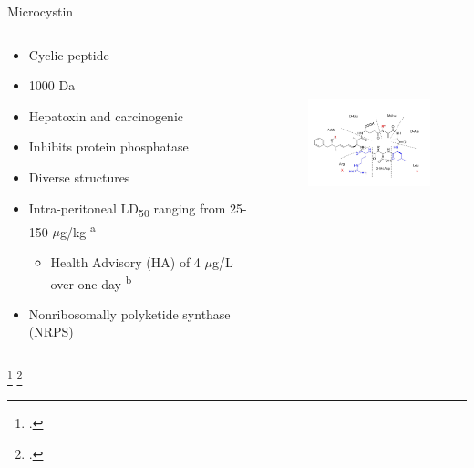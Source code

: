 \begin{frame}{Microcystin}

\begin{columns}
	\begin{column}{0.5\textwidth}

	\begin{itemize}
		\item Cyclic peptide
		\item 1000 Da
		\item Hepatoxin and carcinogenic
		\item Inhibits protein phosphatase
		\item Diverse structures 
		\item Intra-peritoneal LD\textsubscript{50} ranging from 25-150 $\mu$g/kg  \textsuperscript{a}
			\begin{itemize}
				\item Health Advisory (HA) of 4 $\mu$g/L over one day \textsuperscript{b}
			\end{itemize}
		\item Nonribosomally polyketide synthase (NRPS)
	\end{itemize}
	\end{column}
	\begin{column}{0.3\textwidth}
\begin{figure}[ht]
	\centering
	\hspace*{-1cm}
	\includegraphics[width=2in, height=2.2in]{../figures/Microcystin-LR.png}
\end{figure}
	\end{column}
\end{columns}
\footcitetext{[a], dittmann_cyanobacterial_2012}
\footcitetext{[b], usepa_draft_2016}
\end{frame}
